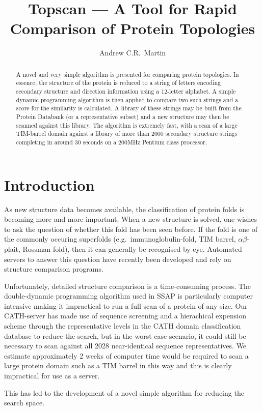 \documentclass{article}
\title{Topscan --- A Tool for Rapid Comparison of Protein Topologies}
\author{Andrew C.R.\ Martin}
\begin{document}
\maketitle

\begin{abstract}
A novel and very simple algorithm is presented for comparing protein
topologies. In essence, the structure of the protein is reduced to a
string of letters encoding secondary structure and direction
information using a 12-letter alphabet. A simple dynamic programming
algorithm is then applied to compare two such strings and a score for
the similarity is calculated. A library of these strings may be built
from the Protein Databank (or a representative subset) and a new
structure may then be scanned against this library. The algorithm is
extremely fast, with a scan of a large TIM-barrel domain against a
library of more than 2000 secondary structure strings completing in
around 30 seconds on a 200MHz Pentium class processor.
\end{abstract}

\section{Introduction}
As new structure data becomes available, the classification of protein
folds is becoming more and more important. When a new structure is
solved, one wishes to ask the question of whether this fold has been
seen before. If the fold is one of the commonly occuring superfolds
(e.g.\ immunoglobulin-fold, TIM barrel, $\alpha\beta$-plait, Rossman fold),
then it can generally be recognised by eye. Automated servers to
answer this question have recently been developed and rely on
structure comparison programs. 

Unfortunately, detailed structure comparison is a time-consuming
process. The double-dynamic programming algorithm used in SSAP is
particularly computer intensive making it impractical to run a full
scan of a protein of any size. Our CATH-server has made use of
sequence screening and a hierachical expension scheme through the
representative levels in the CATH domain classification database to
reduce the search, but in the worst case scenario, it could still be
necessary to scan against all 2028 near-identical sequence
representatives. We estimate approximately 2 weeks of computer time
would be required to scan a large protein domain such as a TIM barrel
in this way and this is clearly impractical for use as a server.

This has led to the development of a novel simple algorithm for
reducing the search space.
\end{document}
